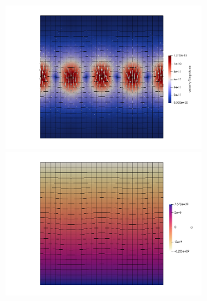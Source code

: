 \begin{center}
\includegraphics[width=7.5cm]{python_codes/fieldstone_40/RESULTS/vel}
\includegraphics[width=7.5cm]{python_codes/fieldstone_40/RESULTS/p}
\end{center}


